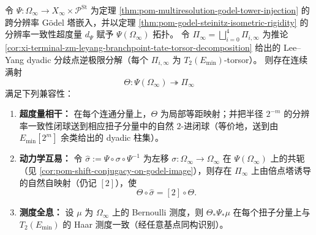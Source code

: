\begin{conjecture}\label{conj:killo-godel-leyang-coherent-factor}
令 \(\Psi:\Omega_\infty\to X_\infty\times \mathcal P^{\mathrm{St}}\) 为定理 \ref{thm:pom-multiresolution-godel-tower-injection} 的跨分辨率 Gödel 塔嵌入，并以定理 \ref{thm:pom-godel-steinitz-isometric-rigidity} 的分辨率一致性超度量 \(d_\Psi\) 赋予 \(\Psi(\Omega_\infty)\) 拓扑。
令
\(
\Pi_\infty=\bigsqcup_{i=0}^4\Pi_{i,\infty}
\)
为推论 \ref{cor:xi-terminal-zm-leyang-branchpoint-tate-torsor-decomposition} 给出的 Lee--Yang dyadic 分歧点逆极限分解（每个 \(\Pi_{i,\infty}\) 为 \(T_2(E_{\min})\)-torsor）。
则存在连续满射
\[
\Theta:\Psi(\Omega_\infty)\twoheadrightarrow \Pi_\infty
\]
满足下列兼容性：
\begin{enumerate}
  \item \textbf{超度量相干：} 在每个连通分量上，\(\Theta\) 为局部等距映射；并把半径 \(2^{-m}\) 的分辨率一致性闭球送到相应扭子分量中的自然 \(2\)-进闭球（等价地，送到由 \(E_{\min}[2^m]\) 余类给出的 dyadic 柱集）。
  \item \textbf{动力学互易：} 令 \(\widehat\sigma:=\Psi\circ\sigma\circ\Psi^{-1}\) 为左移 \(\sigma:\Omega_\infty\to\Omega_\infty\) 在 \(\Psi(\Omega_\infty)\) 上的共轭（见 \ref{cor:pom-shift-conjugacy-on-godel-image}），则存在 \(\Pi_\infty\) 上由倍点塔诱导的自然自映射（仍记 \([2]\)），使
  \[
  \Theta\circ \widehat\sigma=[2]\circ\Theta.
  \]
  \item \textbf{测度全息：} 设 \(\mu\) 为 \(\Omega_\infty\) 上的 Bernoulli 测度，则 \(\Theta_*\Psi_*\mu\) 在每个扭子分量上与 \(T_2(E_{\min})\) 的 Haar 测度一致（经任意基点同构识别）。
\end{enumerate}
\end{conjecture}
